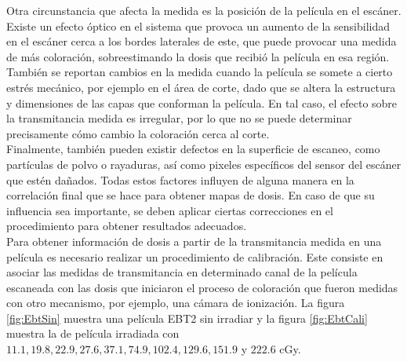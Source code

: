 Otra circunstancia que afecta la medida es la posición de la película en el escáner. Existe un efecto óptico en el sistema que provoca un aumento de la sensibilidad en el escáner cerca a los bordes laterales de este, que puede provocar una medida de más coloración, sobreestimando la dosis que recibió la película en esa región.\\

También se reportan cambios en la medida cuando la película se somete a cierto estrés mecánico\cite{Yu2006}, por ejemplo en el área de corte, dado que se altera la estructura y dimensiones de las capas que conforman la película. En tal caso, el efecto sobre la transmitancia medida es irregular, por lo que no se puede determinar precisamente cómo cambio la coloración cerca al corte.\\

Finalmente, también pueden existir defectos en la superficie de escaneo, como partículas de polvo o rayaduras, así como pixeles específicos del sensor del escáner que estén dañados. Todas estos factores influyen de alguna manera en la correlación final que se hace para obtener mapas de dosis. En caso de que su influencia sea importante, se deben aplicar ciertas correcciones en el procedimiento para obtener resultados adecuados.\\

Para obtener información de dosis a partir de la transmitancia medida en una película es necesario realizar un procedimiento de calibración. Este consiste en asociar las medidas de transmitancia en determinado canal de la película escaneada con las dosis que iniciaron el proceso de coloración que fueron medidas con otro mecanismo, por ejemplo, una cámara de ionización. La figura \ref{fig:EbtSin} muestra una película EBT2 sin irradiar y la figura \ref{fig:EbtCali} muestra la de película irradiada con $11.1 ,  19.8, 22.9, 27.6, 37.1, 74.9, 102.4, 129.6, 151.9$ y $222.6 $ cGy.\\

